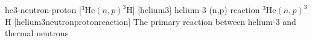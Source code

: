 \newglsXreaction%
{he3-neutron-proton}%
[{}$^3$He$(n,p)^3$H]%
[helium3]%
{helium-3 (n,p) reaction}%
{{}$^3$He$(n,p)^3$H}%
[helium3neutronprotonreaction]%
{The primary reaction between helium-3 and thermal neutrons}%